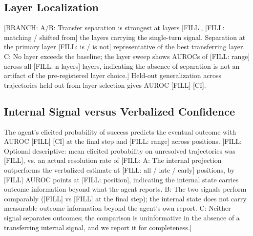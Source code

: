 \documentclass{article}
\begin{document}
\subsection{Layer Localization}

[BRANCH:
A/B: Transfer separation is strongest at layers [FILL], [FILL: matching / shifted from] the layers carrying the single-turn signal. Separation at the primary layer [FILL: is / is not] representative of the best transferring layer.
C: No layer exceeds the baseline; the layer sweep shows AUROCs of [FILL: range] across all [FILL: n layers] layers, indicating the absence of separation is not an artifact of the pre-registered layer choice.]
Held-out generalization across trajectories held out from layer selection gives AUROC [FILL] [CI].


\subsection{Internal Signal versus Verbalized Confidence}

The agent's elicited probability of success predicts the eventual outcome with AUROC [FILL] [CI] at the final step and [FILL: range] across positions. [FILL: Optional descriptive: mean elicited probability on unresolved trajectories was [FILL], vs. an actual resolution rate of [FILL: %
A: The internal projection outperforms the verbalized estimate at [FILL: all / late / early] positions, by [FILL] AUROC points at [FILL: position], indicating the internal state carries outcome information beyond what the agent reports.
B: The two signals perform comparably ([FILL] vs [FILL] at the final step); the internal state does not carry measurable outcome information beyond the agent's own report.
C: Neither signal separates outcomes; the comparison is uninformative in the absence of a transferring internal signal, and we report it for completeness.]

\end{document}
